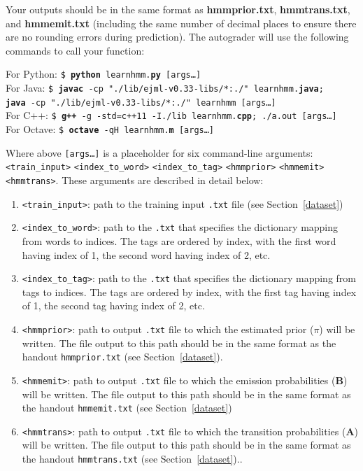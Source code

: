 \documentclass{article}
\begin{document}
Your outputs should be in the same format as \textbf{hmmprior.txt}, \textbf{hmmtrans.txt}, and \textbf{hmmemit.txt} (including the same number of decimal places to ensure there are no rounding errors during prediction). The autograder will use the following commands to call your function:

\begin{tabbing}
For Python: \=\texttt{\$ \textbf{python} learnhmm.\textbf{py} [args\dots]}\\
For Java: \>\texttt{\$ \textbf{javac} -cp "./lib/ejml-v0.33-libs/*:./" learnhmm.\textbf{java};\\ \>  \texttt{\textbf{java} -cp "./lib/ejml-v0.33-libs/*:./" learnhmm [args\dots]}}\\
For C++: \>\texttt{\$ \textbf{g++} -g -std=c++11 -I./lib learnhmm.\textbf{cpp}; ./a.out [args\dots]}\\
For Octave: \>\texttt{\$ \textbf{octave} -qH learnhmm.\textbf{m} [args\dots]}
\end{tabbing}

Where above \texttt{[args\dots]} is a placeholder for six command-line arguments:\texttt{<train\_input>} \texttt{<index\_to\_word>} \texttt{<index\_to\_tag>} \texttt{<hmmprior>} \texttt{<hmmemit>} \texttt{<hmmtrans>}. These arguments are described in detail below:
\begin{enumerate}
    \item \texttt{<train\_input>}: path to the training input \texttt{.txt} file (see Section~\ref{dataset})
    \item \texttt{<index\_to\_word>}: path to the \texttt{.txt} that specifies the dictionary mapping from words to indices. The tags are ordered by index, with the first word having index of 1, the second word having index of 2, etc.
    \item \texttt{<index\_to\_tag>}: path to the \texttt{.txt} that specifies the dictionary mapping from tags to indices. The tags are ordered by index, with the first tag having index of 1, the second tag having index of 2, etc.
    \item \texttt{<hmmprior>}: path to output \texttt{.txt} file to which the estimated prior (\boldmath${\pi}$) will be written. The file output to this path should be in the same format as the handout \texttt{hmmprior.txt} (see Section~\ref{dataset}).
    \item \texttt{<hmmemit>}: path to output \texttt{.txt} file to which the emission probabilities ($\mathbf B$) will be written. The file output to this path should be in the same format as the handout \texttt{hmmemit.txt} (see Section~\ref{dataset})
    \item \texttt{<hmmtrans>}: path to output \texttt{.txt} file to which the transition probabilities ($\mathbf A$) will be written. The file output to this path should be in the same format as the handout \texttt{hmmtrans.txt} (see Section~\ref{dataset})..
\end{enumerate}
\end{document}
